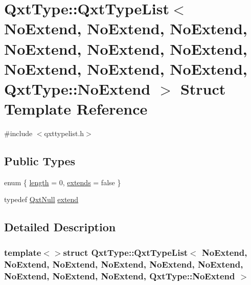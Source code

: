 \hypertarget{struct_qxt_type_1_1_qxt_type_list_3_01_no_extend_00_01_no_extend_00_01_no_extend_00_01_no_extenda7fddf7e57fdf60b2427454b96876017}{\section{Qxt\-Type\-:\-:Qxt\-Type\-List$<$ No\-Extend, No\-Extend, No\-Extend, No\-Extend, No\-Extend, No\-Extend, No\-Extend, No\-Extend, No\-Extend, Qxt\-Type\-:\-:No\-Extend $>$ Struct Template Reference}
\label{struct_qxt_type_1_1_qxt_type_list_3_01_no_extend_00_01_no_extend_00_01_no_extend_00_01_no_extenda7fddf7e57fdf60b2427454b96876017}
}


{\ttfamily \#include $<$qxttypelist.\-h$>$}

\subsection*{Public Types}
\begin{DoxyCompactItemize}
\item 
enum \{ \hyperlink{struct_qxt_type_1_1_qxt_type_list_3_01_no_extend_00_01_no_extend_00_01_no_extend_00_01_no_extenda7fddf7e57fdf60b2427454b96876017_ad5ced648ab37c5852f4cf40715ad9b6aae189b9b205bf18394ec6f8888af0ecc2}{length} = 0, 
\hyperlink{struct_qxt_type_1_1_qxt_type_list_3_01_no_extend_00_01_no_extend_00_01_no_extend_00_01_no_extenda7fddf7e57fdf60b2427454b96876017_ad5ced648ab37c5852f4cf40715ad9b6aa89d52d96b7180b21857b5b36a63b6d70}{extends} = false
 \}
\item 
typedef \hyperlink{struct_qxt_null}{Qxt\-Null} \hyperlink{struct_qxt_type_1_1_qxt_type_list_3_01_no_extend_00_01_no_extend_00_01_no_extend_00_01_no_extenda7fddf7e57fdf60b2427454b96876017_a2505fa567eff946c062f1328b7ef850c}{extend}
\end{DoxyCompactItemize}


\subsection{Detailed Description}
\subsubsection*{template$<$$>$struct Qxt\-Type\-::\-Qxt\-Type\-List$<$ No\-Extend, No\-Extend, No\-Extend, No\-Extend, No\-Extend, No\-Extend, No\-Extend, No\-Extend, No\-Extend, Qxt\-Type\-::\-No\-Extend $>$}



